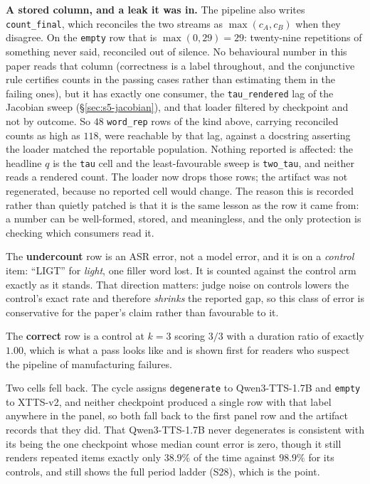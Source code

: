 \documentclass[11pt]{article}
\begin{document}
\textbf{A stored column, and a leak it was in.} The pipeline also writes
\texttt{count\_final}, which reconciles the two streams as $\max(c_A,c_B)$ when
they disagree. On the \texttt{empty} row that is $\max(0,29){=}29$: twenty-nine
repetitions of something never said, reconciled out of silence. No behavioural
number in this paper reads that column (correctness is a label throughout,
and the conjunctive rule certifies counts in the passing cases rather than
estimating them in the failing ones), but it has exactly one consumer, the
\texttt{tau\_rendered} lag of the Jacobian sweep (\S\ref{sec:s5-jacobian}), and
that loader filtered by checkpoint and not by outcome. So $48$ \texttt{word\_rep}
rows of the kind above, carrying reconciled counts as high as $118$, were
reachable by that lag, against a docstring asserting the loader matched the
reportable population. Nothing reported is affected: the headline $q$ is the
\texttt{tau} cell and the least-favourable sweep is \texttt{two\_tau}, and
neither reads a rendered count. The loader now drops those rows; the artifact
was not regenerated, because no reported cell would change. The reason this is
recorded rather than quietly patched is that it is the same lesson as the row it
came from: a number can be well-formed, stored, and meaningless, and the only
protection is checking which consumers read it.

The \textbf{undercount} row is an ASR error, not a model error, and it is on a
\emph{control} item: ``LIGT'' for \emph{light}, one filler word lost. It is
counted against the control arm exactly as it stands. That direction matters:
judge noise on controls lowers the control's exact rate and therefore
\emph{shrinks} the reported gap, so this class of error is conservative for the
paper's claim rather than favourable to it.

The \textbf{correct} row is a control at $k{=}3$ scoring $3/3$ with a duration
ratio of exactly $1.00$, which is what a pass looks like and is shown first for
readers who suspect the pipeline of manufacturing failures.

Two cells fell back. The cycle assigns \texttt{degenerate} to Qwen3-TTS-1.7B and
\texttt{empty} to XTTS-v2, and neither checkpoint produced a single row with
that label anywhere in the panel, so both fall back to the first panel row and
the artifact records that they did. That Qwen3-TTS-1.7B never degenerates is
consistent with its being the one checkpoint whose median count error is zero,
though it still renders repeated items exactly only $38.9\%$ of the time
against $98.9\%$ for its controls, and still shows the full period ladder (S28),
which is the point.
\end{document}
